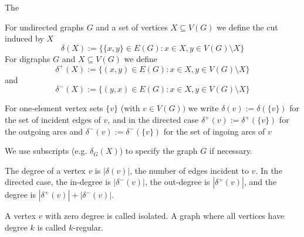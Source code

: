 % 
The 
\begin{definition}
For undirected graphs $G$ and a set of vertices $X \subseteq V(G)$ we define the cut induced by $X$
$$\delta(X) := \{\{x, y\} \in E(G) : x \in X , y \in V(G) \setminus X\}$$
For digraphs $G$ and $X \subseteq V(G)$ we define 
$$\delta^+(X) := \{(x, y) \in E(G) : x \in X , y \in V(G) \setminus X\}$$ and
$$\delta^-(X) := \{(y, x) \in E(G) : x \in X , y \in V(G) \setminus X\}$$
 
For one-element vertex sets $\{v\}$ (with $v \in V(G))$ we write $\delta(v) :=\delta(\{v\})$ for the set of incident 
edges of $v$, and in the directed case 
$ \delta^+(v) := \delta^+(\{v\})$ for the outgoing arcs and $\delta^-(v) := \delta^-(\{v\})$ for the set of ingoing 
arcs of $v$
\end{definition}
We use subscripts (e.g. $\delta_G(X)$) to specify the graph $G$ if necessary.
\begin{definition}
The degree of a vertex $v$ is $|\delta(v)|$, the number of edges incident to $v$. In the directed 
case, the in-degree is $|\delta^-(v)|$, the out-degree is $|\delta^+(v)|$, and the degree is 
$|\delta^+(v)|+ |\delta^-(v)|$.
\end{definition}
A vertex $v$ with zero degree is called isolated. A graph where all vertices have degree $k$ is called $k$-regular.

